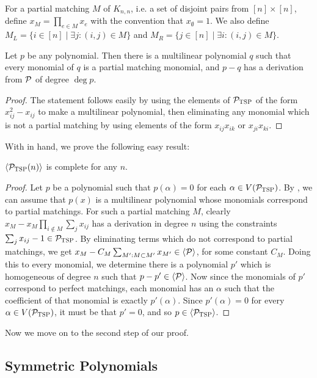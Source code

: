 For a partial matching $M$ of $K_{n,n}$, i.e. a set of disjoint pairs from $[n] \times [n]$, define $x_M = \prod_{e \in M} x_e$ with the convention that $x_{\emptyset} = 1$. We also define $M_L = \{i \in [n] \mid \exists j: (i,j) \in M\}$ and $M_R = \{j \in [n] \mid \exists i: (i,j) \in M\}$. 
\begin{lemma}\label{lem:tsp-monomials}
 Let $p$ be any polynomial. Then there is a multilinear polynomial $q$ such that every monomial of $q$ is a partial matching monomial, and $p-q$ has a derivation from $\mathcal P$ of degree $\deg p$.
\end{lemma}
\begin{proof}
The statement follows easily by using the elements of $\mathcal P_{\textsc{TSP}}$ of the form $x_{ij}^2 - x_{ij}$ to make a multilinear polynomial, then eliminating any monomial which is not a partial matching by using elements of the form $x_{ij}x_{ik}$ or $x_{ji}x_{ki}$. 
\end{proof}
With  in hand, we prove the following easy result:
\begin{lemma}\label{lem:tsp-complete}
$\langle \mathcal P_{\textsc{TSP}}(n) \rangle$ is complete for any $n$.  
\end{lemma}
\begin{proof}
Let $p$ be a polynomial such that $p(\alpha) = 0$ for each $\alpha \in V(\mathcal P_{\textsc{TSP}})$. By , we can assume that $p(x)$ is a multilinear polynomial whose monomials correspond to partial matchings. For such a partial matching $M$, clearly $x_M - x_M\prod_{i \notin M} \sum_j x_{ij}$ has a derivation in degree $n$ using the constraints $\sum_j x_{ij} - 1 \in \mathcal P_{\textsc{TSP}}$. By eliminating terms which do not correspond to partial matchings, we get $x_M - C_M\sum_{M': M \subset M'} x_{M'} \in \langle \mathcal P \rangle$, for some constant $C_M$. Doing this to every monomial, we determine there is a polynomial $p'$ which is homogeneous of degree $n$ such that $p - p' \in \langle \mathcal P \rangle$. Now since the monomials of $p'$ correspond to perfect matchings, each monomial has an $\alpha$ such that the coefficient of that monomial is exactly $p'(\alpha)$. Since $p'(\alpha) = 0$ for every $\alpha \in V(\mathcal P_{\textsc{TSP}})$, it must be that $p' = 0$, and so $p \in \langle \mathcal P_{\textsc{TSP}} \rangle$.
\end{proof}
Now we move on to the second step of our proof. 

\subsection{Symmetric Polynomials}

